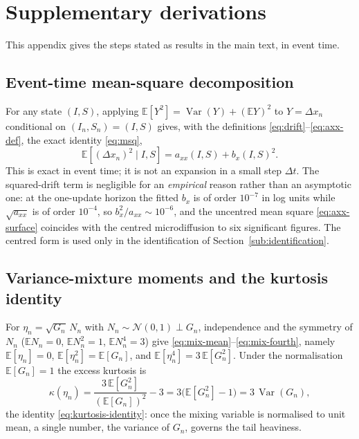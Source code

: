 \documentclass[11pt]{article}
\theoremstyle{plain}
\theoremstyle{definition}
\newcommand{\E}{\mathbb{E}}
\newcommand{\Var}{\operatorname{Var}}
\newcommand{\Norm}{\mathcal{N}}
\newcommand{\axx}{a_{xx}}
\begin{document}
\FloatBarrier
\clearpage



\FloatBarrier
\clearpage
\appendix

\section{Supplementary derivations}
\label{app:derivations}
This appendix gives the steps stated as results in the main text, in event time.

\subsection{Event-time mean-square decomposition}
\label{app:msq}
For any state $(I,S)$, applying $\E[Y^2]=\Var(Y)+(\E Y)^2$ to $Y=\Delta x_n$ conditional on
$(I_n,S_n)=(I,S)$ gives, with the definitions \eqref{eq:drift}--\eqref{eq:axx-def}, the
exact identity \eqref{eq:msq},
\begin{equation*}
  \E\!\left[(\Delta x_n)^2 \mid I,S\right] = \axx(I,S) + b_x(I,S)^2 .
\end{equation*}
This is exact in event time; it is not an expansion in a small step $\Delta t$. The
squared-drift term is negligible for an \emph{empirical} reason rather than an asymptotic
one: at the one-update horizon the fitted $b_x$ is of order $10^{-7}$ in log units while
$\sqrt{\axx}$ is of order $10^{-4}$, so $b_x^2/\axx \sim 10^{-6}$, and the uncentred mean
square \eqref{eq:axx-surface} coincides with the centred microdiffusion to six significant
figures. The centred form is used only in the identification of
Section~\ref{sub:identification}.

\subsection{Variance-mixture moments and the kurtosis identity}
\label{app:moments}
For $\eta_n=\sqrt{G_n}\,N_n$ with $N_n\sim\Norm(0,1)\perp G_n$, independence and the
symmetry of $N_n$ ($\E N_n=0$, $\E N_n^2=1$, $\E N_n^4=3$) give
\eqref{eq:mix-mean}--\eqref{eq:mix-fourth}, namely $\E[\eta_n]=0$, $\E[\eta_n^2]=\E[G_n]$,
and $\E[\eta_n^4]=3\,\E[G_n^2]$. Under the normalisation $\E[G_n]=1$ the excess kurtosis is
\begin{equation*}
  \kappa(\eta_n) = \frac{3\,\E[G_n^2]}{(\E[G_n])^2} - 3 = 3\bigl(\E[G_n^2]-1\bigr) = 3\,\Var(G_n),
\end{equation*}
the identity \eqref{eq:kurtosis-identity}: once the mixing variable is normalised to unit
mean, a single number, the variance of $G_n$, governs the tail heaviness.
\end{document}
